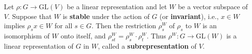 Let $\rho: G \to \text{GL}(V)$ be a linear representation and let $W$ be a vector subspace of $V$. Suppose that $W$ is \textbf{stable} under the action of $G$ (or \textbf{invariant}), i.e., $x \in W$ implies $\rho_s x \in W$ for all $s \in G$. Then the restriction $\rho_s^W$ of $\rho_s$ to $W$ is an isomorphism of $W$ onto itself, and $\rho_{st}^W = \rho_s^W \cdot \rho_t^W$. Thus $\rho^W: G \to \text{GL}(W)$ is a linear representation of $G$ in $W$, called a \textbf{subrepresentation} of $V$.
